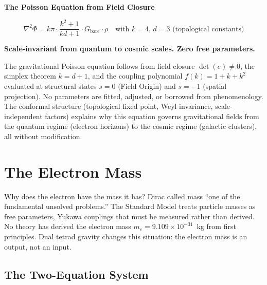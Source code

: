 \documentclass[aps,prd,preprint,superscriptaddress,showpacs,preprintnumbers,amsmath,amssymb,nofootinbib]{revtex4-2}
\begin{document}
\vspace{1.5em}
\noindent
\colorbox{resultgreen}{\parbox{\dimexpr\textwidth-2\fboxsep\relax}{%
\vspace{0.8em}
\centering
\textbf{\large The Poisson Equation from Field Closure}

\vspace{0.5em}
\boldmath
\begin{equation}
\nabla^2\Phi = k\pi \cdot \frac{k^2+1}{kd+1} \cdot G_{\text{bare}} \cdot \rho
\quad \text{with } k=4, \, d=3 \text{ (topological constants)}
\label{eq:poisson-boxed}
\end{equation}
\unboldmath

\vspace{0.3em}
\textbf{Scale-invariant from quantum to cosmic scales. Zero free parameters.}
\vspace{0.5em}}}
\vspace{1.5em}

The gravitational Poisson equation follows from field closure $\det(e) \neq 0$, the simplex theorem $k = d+1$, and the coupling polynomial $f(k) = 1 + k + k^2$ evaluated at structural states $s=0$ (Field Origin) and $s=-1$ (spatial projection). No parameters are fitted, adjusted, or borrowed from phenomenology. The conformal structure (topological fixed point, Weyl invariance, scale-independent factors) explains why this equation governs gravitational fields from the quantum regime (electron horizons) to the cosmic regime (galactic clusters), all without modification.

\section{The Electron Mass}
\label{sec:electron-mass}

Why does the electron have the mass it has? Dirac called mass ``one of the fundamental unsolved problems.'' The Standard Model treats particle masses as free parameters, Yukawa couplings that must be measured rather than derived. No theory has derived the electron mass $m_e = 9.109 \times 10^{-31}$~kg from first principles. Dual tetrad gravity changes this situation: the electron mass is an output, not an input.

\subsection{The Two-Equation System}
\label{subsec:two-eq}
\end{document}
